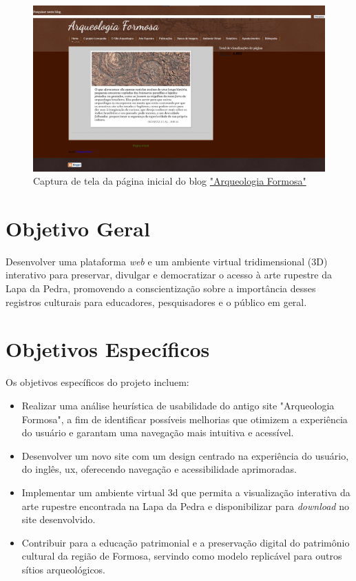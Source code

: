 \begin{figure}
    \centering
    \includegraphics[width=1\linewidth]{images/home-blog-print.png}
    \caption{Captura de tela da página inicial do blog \href{https://arqueologiaformosa.blogspot.com/}{"Arqueologia Formosa"}}
    \label{fig:Captura de tela da página inicial do blog}
\end{figure}

\section{Objetivo Geral}
Desenvolver uma plataforma \textit{web} e um ambiente virtual tridimensional (3D) interativo para preservar, divulgar e democratizar o acesso à arte rupestre da Lapa da Pedra, promovendo a conscientização sobre a importância desses registros culturais para educadores, pesquisadores e o público em geral.

\section{Objetivos Específicos}
Os objetivos específicos do projeto incluem:
\begin{itemize}
    \item Realizar uma análise heurística de usabilidade do antigo site "Arqueologia Formosa", a fim de identificar possíveis melhorias que otimizem a experiência do usuário e garantam uma navegação mais intuitiva e acessível.
    \item Desenvolver um novo site com um design centrado na experiência do usuário, do inglês, \gls{ux}, oferecendo navegação e acessibilidade aprimoradas.
    \item Implementar um ambiente virtual \gls{3d} que permita a visualização interativa da arte rupestre encontrada na Lapa da Pedra e disponibilizar para \textit{download} no site desenvolvido.
    \item Contribuir para a educação patrimonial e a preservação digital do patrimônio cultural da região de Formosa, servindo como modelo replicável para outros sítios arqueológicos.
\end{itemize}


